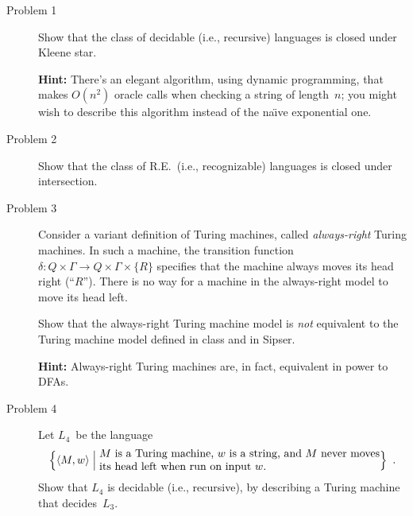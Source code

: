 \documentclass[letterpaper,12pt]{article}
\begin{document}
\newlength{\boxwidth}
\setlength{\boxwidth}{\textwidth}
\addtolength{\boxwidth}{-2cm}
\noindent{}
\vspace{0.7cm}

\thispagestyle{empty}

\begin{description}

\item[Problem 1] Show that the class of decidable (i.e., recursive)
  languages is closed under Kleene star.

  \textbf{Hint:} There's an elegant algorithm, using dynamic
  programming, that makes $O(n^2)$ oracle calls when checking a string
  of length~$n$; you might wish to describe this algorithm instead of
  the na{\"\i}ve exponential one.

\item[Problem 2] Show that the class of R.E.\ (i.e., recognizable)
  languages is closed under intersection.

\item[Problem 3] Consider a variant definition of Turing machines,
  called \emph{always-right} Turing machines.  In such a machine, the
  transition function $\delta\colon Q \times \Gamma \to Q \times
  \Gamma \times \{R\}$ specifies that the machine always moves its
  head right (``$R$'').  There is no way for a machine in the
  always-right model to move its head left.

  Show that the always-right Turing machine model is \emph{not}
  equivalent to the Turing machine model defined in class and in
  Sipser.

  \textbf{Hint:} Always-right Turing machines are, in fact, equivalent
  in power to DFAs.

\item[Problem 4] Let $L_4$~be the language
  \begin{displaymath}
    \Bigl\{
        \langle M,w \rangle
      \Bigm|
      \parbox{3.5in}{$M$~is a Turing machine, $w$~is a string,
        and $M$ never moves its head left when run on input~$w$.}
      \Bigr\} \enspace.
  \end{displaymath}
  Show that $L_4$ is decidable (i.e., recursive), by describing a
  Turing machine that decides~$L_3$.


\end{description}
\end{document}

